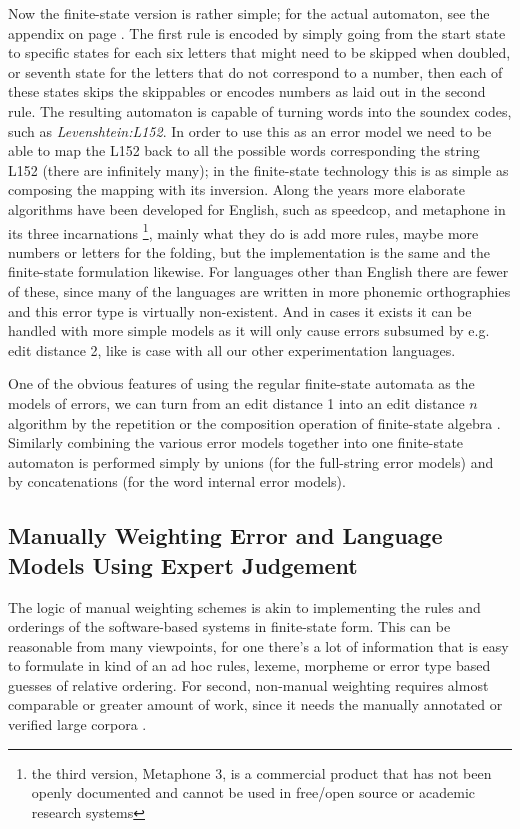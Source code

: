 \documentclass[a4paper,12pt]{article}
\begin{document}
Now the finite-state version is rather simple; for the actual automaton, see
the appendix on page \pageref{appendix:soundex}. The first rule is encoded by
simply going from the start state to specific states for each six letters that
might need to be skipped when doubled, or seventh state for the letters that do
not correspond to a number, then each of these states skips the skippables or
encodes numbers as laid out in the second rule. The resulting automaton is
capable of turning words into the soundex codes, such as
\emph{Levenshtein:L152}. In order to use this as an error model we need to be
able to map the L152 back to all the possible words corresponding the string
L152 (there are infinitely many); in the finite-state technology this is as
simple as composing the mapping with its inversion. Along the years more
elaborate algorithms have been developed for English, such as speedcop, and
metaphone in its three incarnations
\cite[]{philips1990hanging,philips2000double}\footnote{the third version,
Metaphone 3, is a commercial product that has not been openly documented and
cannot be used in free/open source or academic research systems}, mainly what
they do is add more rules, maybe more numbers or letters for the folding, but
the implementation is the same and the finite-state formulation likewise. For
languages other than English there are fewer of these, since many of the
languages are written in more phonemic orthographies and this error type is
virtually non-existent. And in cases it exists it can be handled with more
simple models as it will only cause errors subsumed by e.g. edit distance 2,
like is case with all our other experimentation languages.

One of the obvious features of using the regular finite-state automata as the
models of errors, we can turn from an edit distance 1 into an edit distance $n$
algorithm by the repetition or the composition operation of finite-state
algebra \cite[]{pirinen2012effects}.  Similarly combining the various error
models together into one finite-state automaton is performed simply by unions
(for the full-string error models) and by concatenations (for the word internal
error models).

\subsection{Manually Weighting Error and Language Models Using Expert
Judgement}
\label{subsec:manual-weighting}

The logic of manual weighting schemes is akin to implementing the rules and
orderings of the software-based systems in finite-state form. This can be
reasonable from many viewpoints, for one there's a lot of information that
is easy to formulate in kind of an ad hoc rules, lexeme, morpheme or error
type based guesses of relative ordering. For second, non-manual weighting
requires almost comparable or greater amount of work, since it needs the
manually annotated or verified large corpora .
\end{document}

